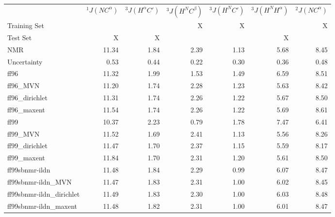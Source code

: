 \documentclass[12pt]{article}
\begin{document}
\small

\begin{table}
\begin{tabular}{lrrrrrr}
\toprule
  &  $^1J(NC^\alpha)$ & $^3J(H^\alpha C\prime)$ & $^3J(H^NC^\beta)$ &  $^3J(H^NC\prime)$ &  $^3J(H^NH^\alpha)$ &  $^2J(NC^\alpha)$ \\
Training Set &    &    & X & X &    & X \\
Test     Set & X  & X  &   &   & X  &   \\
NMR                         &    11.34 &          1.84 &      2.39 &          1.13 &      5.68 &     8.45 \\
Uncertainty                 &     0.53 &          0.44 &      0.22 &          0.30 &      0.36 &     0.48 \\
\toprule
ff96                     &    11.32 &          1.99 &      1.53 &          1.49 &      6.59 &     8.51 \\
ff96\_MVN                 &    11.20 &          1.74 &      2.28 &          1.23 &      5.63 &     8.42 \\
ff96\_dirichlet           &    11.31 &          1.74 &      2.26 &          1.22 &      5.67 &     8.50 \\
ff96\_maxent              &    11.54 &          1.74 &      2.26 &          1.22 &      5.69 &     8.61 \\
\toprule
ff99                     &    10.37 &          2.23 &      0.79 &          1.78 &      7.47 &     6.41 \\
ff99\_MVN                 &    11.52 &          1.69 &      2.41 &          1.13 &      5.56 &     8.26 \\
ff99\_dirichlet           &    11.47 &          1.70 &      2.37 &          1.15 &      5.59 &     8.17 \\
ff99\_maxent              &    11.84 &          1.70 &      2.31 &          1.20 &      5.61 &     8.50 \\
\toprule
ff99sbnmr-ildn           &    11.48 &          1.84 &      2.29 &          0.99 &      6.07 &     8.47 \\
ff99sbnmr-ildn\_MVN       &    11.47 &          1.83 &      2.31 &          1.00 &      6.02 &     8.45 \\
ff99sbnmr-ildn\_dirichlet &    11.49 &          1.83 &      2.30 &          1.00 &      6.03 &     8.48 \\
ff99sbnmr-ildn\_maxent    &    11.48 &          1.82 &      2.31 &          1.00 &      6.01 &     8.47 \\

\end{tabular}
\end{table}
\end{document}
